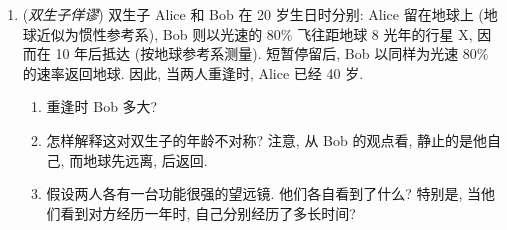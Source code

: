 \begin{RiemannExercise}
\begin{enumerate}[label=(\arabic*),ref=\arabic*,leftmargin=*]
证明若 $(t,x)$ 为与某惯性参考系相联系的时空坐标, 且 $T\in SO_0(1,1)$ 是到全局坐标为 $(t',x')$ 的新惯性参考系的 Lorentz 换基变换, 则对某个 $u\in\mathbb{R}$ 必有
\begin{align*}
  \frac{\partial}{\partial t'}&=T\left(\frac{\partial}{\partial t}\right)
    =\cosh u\,\frac{\partial}{\partial t}+\sinh u\,\frac{\partial}{\partial x},\\
  \frac{\partial}{\partial x'}&=T\left(\frac{\partial}{\partial x}\right)
    =\sinh u\,\frac{\partial}{\partial t}+\cosh u\,\frac{\partial}{\partial x}.
\end{align*}
\item\label{ex:twin-paradox}
(\emph{双生子佯谬}) 双生子 Alice 和 Bob 在 20 岁生日时分别: Alice 留在地球上 (地球近似为惯性参考系), Bob 则以光速的 $80\%$ 飞往距地球 8 光年的行星 X, 因而在 10 年后抵达 (按地球参考系测量). 短暂停留后, Bob 以同样为光速 $80\%$ 的速率返回地球. 因此, 当两人重逢时, Alice 已经 40 岁.
\begin{enumerate}[label=(\alph*),leftmargin=*]
\item 重逢时 Bob 多大?
\item 怎样解释这对双生子的年龄不对称? 注意, 从 Bob 的观点看, 静止的是他自己, 而地球先远离, 后返回.
\item 假设两人各有一台功能很强的望远镜. 他们各自看到了什么? 特别是, 当他们看到对方经历一年时, 自己分别经历了多长时间?


\end{enumerate}
\end{enumerate}
\end{RiemannExercise}
